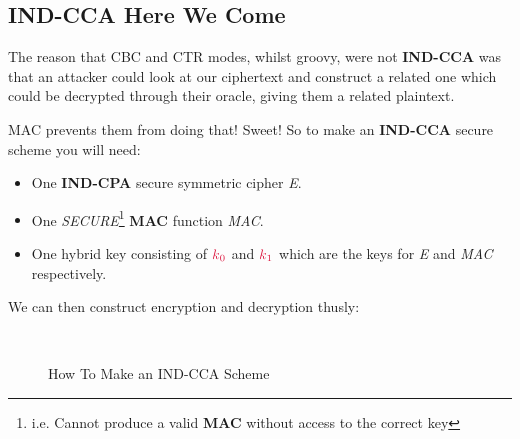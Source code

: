     \subsection{IND-CCA Here We Come}
    The reason that CBC and CTR modes, whilst groovy, were not \textbf{IND-CCA} was that an attacker could look at our ciphertext and construct a related one which could be decrypted through their oracle, giving them a related plaintext.

    MAC prevents them from doing that! Sweet! So to make an \textbf{IND-CCA} secure scheme you will need:
    \begin{itemize}
        \item One \textbf{IND-CPA} secure symmetric cipher \emph{E}.
        \item One \emph{SECURE}\footnote{i.e. Cannot produce a valid \textbf{MAC} without access to the correct key} \textbf{MAC} function \emph{MAC}.
        \item One hybrid key consisting of $\csubk{0}$ and $\csubk{1}$ which are the keys for \emph{E} and \emph{MAC} respectively.
    \end{itemize}

    We can then construct encryption and decryption thusly:
    \begin{figure}[htp!]
    \centering
    ~
    \caption{How To Make an IND-CCA Scheme}
    \label{fig:ind-cca-ed}
    \end{figure}

